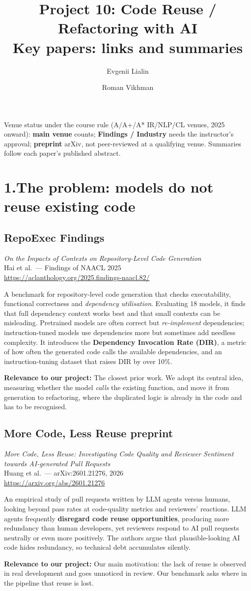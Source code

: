 \documentclass[11pt,a4paper]{article}
\title{Project 10: Code Reuse / Refactoring with AI\\[0.3em]
  \large Key papers: links and summaries}
\author{Evgenii Lialin \and Roman Vikhman}
\date{}
\newcommand{\tagbox}[2]{\colorbox{#1!15}{\textcolor{#1!80!black}{\footnotesize\textbf{#2}}}}
\newcommand{\paper}[6]{%
  \subsection*{#1 \hfill #4}
  \textit{#2}\\
  {\small #3}\\
  {\small\url{#5}}\par
  #6
  \vspace{0.4em}}
\newcommand{\why}[1]{\par\textbf{Relevance to our project:} #1}
\begin{document}
\sloppy
\maketitle

\noindent Venue status under the course rule (A/A+/A* IR/NLP/CL venues, 2025 onward):
\tagbox{main}{main venue} counts;
\tagbox{findings}{Findings / Industry} needs the instructor's approval;
\tagbox{preprint}{preprint} arXiv, not peer-reviewed at a qualifying venue.
Summaries follow each paper's published abstract.

\section{1.\quad The problem: models do not reuse existing code}

\paper{RepoExec}
{On the Impacts of Contexts on Repository-Level Code Generation}
{Hai et al.\ --- Findings of NAACL 2025}
{\tagbox{findings}{Findings}}
{https://aclanthology.org/2025.findings-naacl.82/}
{A benchmark for repository-level code generation that checks executability, functional correctness and
\emph{dependency utilisation}. Evaluating 18 models, it finds that full dependency context works best and
that small contexts can be misleading. Pretrained models are often correct but \emph{re-implement}
dependencies; instruction-tuned models use dependencies more but sometimes add needless complexity.
It introduces the \textbf{Dependency Invocation Rate (DIR)}, a metric of how often the generated code calls
the available dependencies, and an instruction-tuning dataset that raises DIR by over 10\%.
\why{The closest prior work. We adopt its central idea, measuring whether the model \emph{calls} the
existing function, and move it from generation to refactoring, where the duplicated logic is already in
the code and has to be recognised.}}

\paper{More Code, Less Reuse}
{More Code, Less Reuse: Investigating Code Quality and Reviewer Sentiment towards AI-generated Pull Requests}
{Huang et al.\ --- arXiv:2601.21276, 2026}
{\tagbox{preprint}{preprint}}
{https://arxiv.org/abs/2601.21276}
{An empirical study of pull requests written by LLM agents versus humans, looking beyond pass rates at
code-quality metrics and reviewers' reactions. LLM agents frequently \textbf{disregard code reuse
opportunities}, producing more redundancy than human developers, yet reviewers respond to AI pull requests
neutrally or even more positively. The authors argue that plausible-looking AI code hides redundancy,
so technical debt accumulates silently.
\why{Our main motivation: the lack of reuse is observed in real development and goes unnoticed in review.
Our benchmark asks where in the pipeline that reuse is lost.}}
\end{document}
